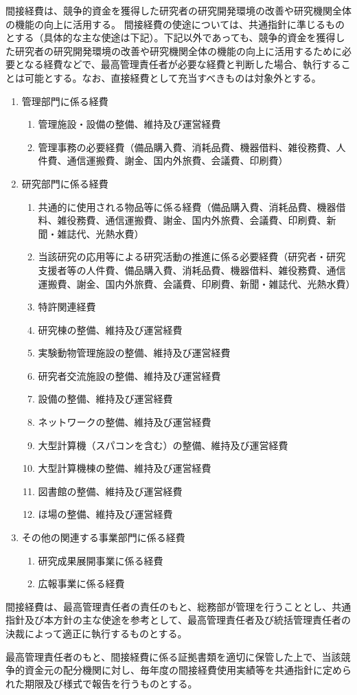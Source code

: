 \documentclass[10pt,a4paper,uplatex]{jsarticle}
\begin{document}
間接経費は、競争的資金を獲得した研究者の研究開発環境の改善や研究機関全体の機能の向上に活用する。
\term 間接経費の使途については、共通指針に準じるものとする（具体的な主な使途は下記）。下記以外であっても、競争的資金を獲得した研究者の研究開発環境の改善や研究機関全体の機能の向上に活用するために必要となる経費などで、最高管理責任者が必要な経費と判断した場合、執行することは可能とする。なお、直接経費として充当すべきものは対象外とする。
\begin{enumerate}
	\item 管理部門に係る経費
		\begin{enumerate}
			\item 管理施設・設備の整備、維持及び運営経費
			\item 管理事務の必要経費（備品購入費、消耗品費、機器借料、雑役務費、人件費、通信運搬費、謝金、国内外旅費、会議費、印刷費）
		\end{enumerate}
	\item 研究部門に係る経費
		\begin{enumerate}
			\item 共通的に使用される物品等に係る経費（備品購入費、消耗品費、機器借料、雑役務費、通信運搬費、謝金、国内外旅費、会議費、印刷費、新聞・雑誌代、光熱水費）
			\item 当該研究の応用等による研究活動の推進に係る必要経費（研究者・研究支援者等の人件費、備品購入費、消耗品費、機器借料、雑役務費、通信運搬費、謝金、国内外旅費、会議費、印刷費、新聞・雑誌代、光熱水費）
			\item 特許関連経費
			\item 研究棟の整備、維持及び運営経費
			\item 実験動物管理施設の整備、維持及び運営経費
			\item 研究者交流施設の整備、維持及び運営経費
			\item 設備の整備、維持及び運営経費
			\item ネットワークの整備、維持及び運営経費
			\item 大型計算機（スパコンを含む）の整備、維持及び運営経費
			\item 大型計算機棟の整備、維持及び運営経費
			\item 図書館の整備、維持及び運営経費
			\item ほ場の整備、維持及び運営経費
		\end{enumerate}
	\item その他の関連する事業部門に係る経費
		\begin{enumerate}
			\item 研究成果展開事業に係る経費
			\item 広報事業に係る経費 
		\end{enumerate}
\end{enumerate}

間接経費は、最高管理責任者の責任のもと、総務部が管理を行うこととし、共通指針及び本方針の主な使途を参考として、最高管理責任者及び統括管理責任者の決裁によって適正に執行するものとする。

最高管理責任者のもと、間接経費に係る証拠書類を適切に保管した上で、当該競争的資金元の配分機関に対し、毎年度の間接経費使用実績等を共通指針に定められた期限及び様式で報告を行うものとする。
\end{document}
